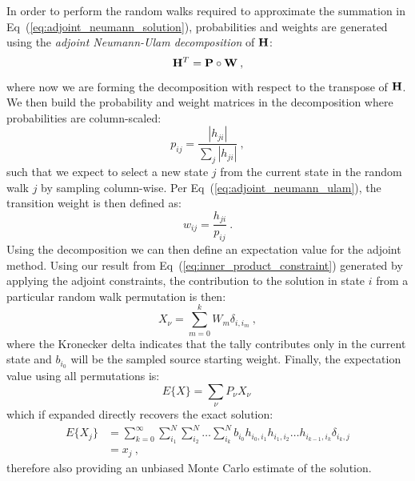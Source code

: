 \documentclass[letterpaper,12pt]{article}
\begin{document}
In order to perform the random walks required to approximate the
summation in Eq~(\ref{eq:adjoint_neumann_solution}), probabilities and
weights are generated using the \textit{adjoint Neumann-Ulam
  decomposition} of $\mathbf{H}$:
\begin{equation}
  \mathbf{H}^{T} = \mathbf{P} \circ \mathbf{W}\:,
  \label{eq:adjoint_neumann_ulam}
\end{equation}
where now we are forming the decomposition with respect to the
transpose of $\mathbf{H}$. We then build the probability and weight
matrices in the decomposition where probabilities are column-scaled:
\begin{equation}
  p_{ij} = \frac{|h_{ji}|}{\sum_j |h_{ji}|}\:,
  \label{eq:adjoint_probability}
\end{equation}
such that we expect to select a new state $j$ from the current state
in the random walk $j$ by sampling column-wise. Per
Eq~(\ref{eq:adjoint_neumann_ulam}), the transition weight is then
defined as:
\begin{equation}
  w_{ij} = \frac{h_{ji}}{p_{ij}}\:.
  \label{eq:adjoint_weight}
\end{equation}
Using the decomposition we can then define an expectation value for
the adjoint method. Using our result from
Eq~(\ref{eq:inner_product_constraint}) generated by applying the
adjoint constraints, the contribution to the solution in state $i$
from a particular random walk permutation is then:
\begin{equation}
  X_{\nu} = \sum_{m=0}^k W_{m} \delta_{i,i_m}\:,
  \label{eq:adjoint_permutation_contribution}
\end{equation}
where the Kronecker delta indicates that the tally contributes only in
the current state and $b_{i_0}$ will be the sampled source starting
weight. Finally, the expectation value using all permutations is:
\begin{equation}
  E\{X\} = \sum_{\nu} P_{\nu} X_{\nu}\:
  \label{eq:adjoint_expectation_value}
\end{equation}
which if expanded directly recovers the exact solution:
\begin{equation}
  \begin{split}
    E\{X_j\} &=\sum_{k=0}^{\infty}\sum_{i_1}^{N}\sum_{i_2}^{N}\ldots
    \sum_{i_k}^{N} b_{i_0} h_{i_0,i_1}h_{i_1,i_2}\ldots
    h_{i_{k-1},i_k} \delta_{i_k,j} \\ &= x_{j}\:,
  \end{split}
  \label{eq:adjoint_expectation_expansion}
\end{equation}
therefore also providing an unbiased Monte Carlo estimate of the
solution.
\end{document}
